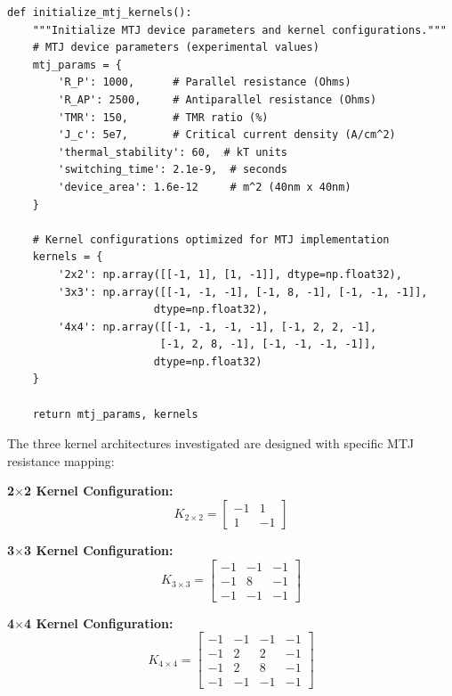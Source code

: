 \documentclass[conference]{IEEEtran}
\begin{document}
\begin{lstlisting}[caption={MTJ kernel implementation with device parameters}]
def initialize_mtj_kernels():
    """Initialize MTJ device parameters and kernel configurations."""
    # MTJ device parameters (experimental values)
    mtj_params = {
        'R_P': 1000,      # Parallel resistance (Ohms)
        'R_AP': 2500,     # Antiparallel resistance (Ohms) 
        'TMR': 150,       # TMR ratio (%)
        'J_c': 5e7,       # Critical current density (A/cm^2)
        'thermal_stability': 60,  # kT units
        'switching_time': 2.1e-9,  # seconds
        'device_area': 1.6e-12     # m^2 (40nm x 40nm)
    }
    
    # Kernel configurations optimized for MTJ implementation
    kernels = {
        '2x2': np.array([[-1, 1], [1, -1]], dtype=np.float32),
        '3x3': np.array([[-1, -1, -1], [-1, 8, -1], [-1, -1, -1]], 
                       dtype=np.float32),
        '4x4': np.array([[-1, -1, -1, -1], [-1, 2, 2, -1], 
                        [-1, 2, 8, -1], [-1, -1, -1, -1]], 
                       dtype=np.float32)
    }
    
    return mtj_params, kernels
\end{lstlisting}

The three kernel architectures investigated are designed with specific MTJ resistance mapping:

\textbf{2$\times$2 Kernel Configuration:}
\begin{equation}
K_{2 \times 2} = \begin{bmatrix} -1 & 1 \\ 1 & -1 \end{bmatrix}
\end{equation}

\textbf{3$\times$3 Kernel Configuration:}
\begin{equation}
K_{3 \times 3} = \begin{bmatrix} -1 & -1 & -1 \\ -1 & 8 & -1 \\ -1 & -1 & -1 \end{bmatrix}
\end{equation}

\textbf{4$\times$4 Kernel Configuration:}
\begin{equation}
K_{4 \times 4} = \begin{bmatrix} -1 & -1 & -1 & -1 \\ -1 & 2 & 2 & -1 \\ -1 & 2 & 8 & -1 \\ -1 & -1 & -1 & -1 \end{bmatrix}
\end{equation}
\end{document}

